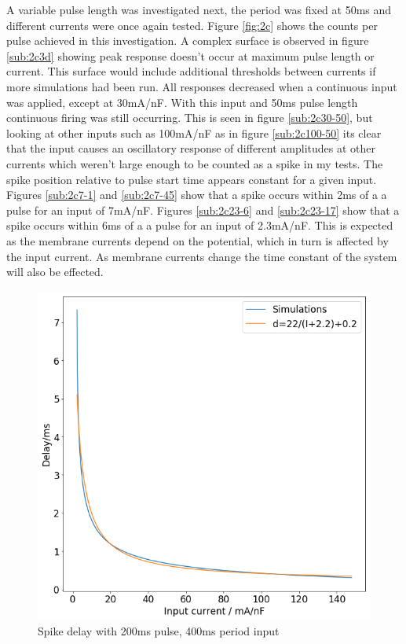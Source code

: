 \documentclass[twoside,twocolumn]{article}
\begin{document}
A variable pulse length was investigated next, the period was fixed at 50ms and different currents were once again tested. Figure \ref{fig:2c} shows the counts per pulse achieved in this investigation. A complex surface is observed in figure \ref{sub:2c3d} showing peak response doesn't occur at maximum pulse length or current. This surface would include additional thresholds between currents if more simulations had been run. All responses decreased when a continuous input was applied, except at 30mA/nF. With this input and 50ms pulse length continuous firing was still occurring. This is seen in figure \ref{sub:2c30-50}, but looking at other inputs such as 100mA/nF as in figure \ref{sub:2c100-50} its clear that the input causes an oscillatory response of different amplitudes at other currents which weren't large enough to be counted as a spike in my tests. 
\newline
The spike position relative to pulse start time appears constant for a given input. Figures \ref{sub:2c7-1} and \ref{sub:2c7-45} show that a spike occurs within 2ms of a a pulse for an input of 7mA/nF. Figures \ref{sub:2c23-6} and \ref{sub:2c23-17} show that a spike occurs within 6ms of a a pulse for an input of 2.3mA/nF. This is expected as the membrane currents depend on the potential, which in turn is affected by the input current. As membrane currents change the time constant of the system will also be effected. 

\begin{figure}[h]
  \centering
    \includegraphics[width=\linewidth]{dm}
  \caption{Spike delay with 200ms pulse, 400ms period input}
  \label{fig:2del}
\end{figure}
\end{document}
